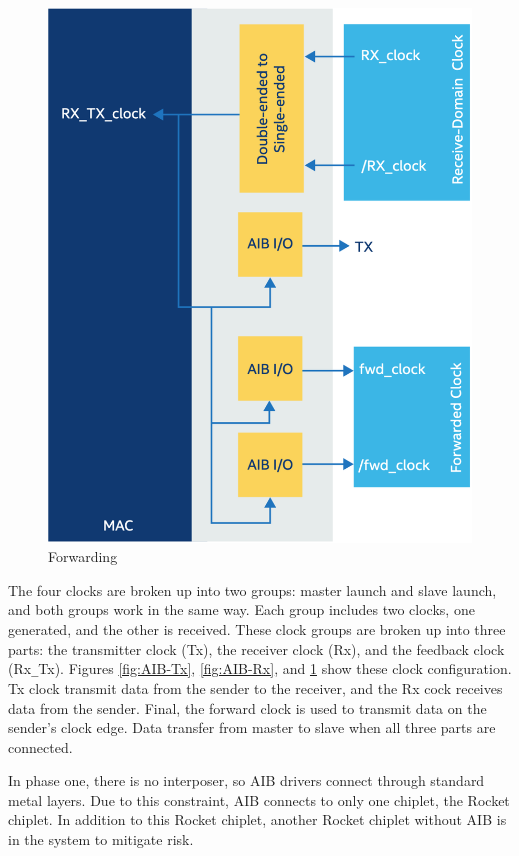 \documentclass[../main.tex]{subfiles}
\begin{document}
\begin{figure}
    \centering
    \includegraphics[scale=.27]{pngs/AIB-Rx-Tx.png}
    \caption{Forwarding\cite{AIBWhitePaper}}
    \label{fig:AIB-Rx-Tx}
\end{figure}


The four clocks are broken up into two groups: master launch and slave launch, and both groups work in the same way. Each group includes two clocks, one generated, and the other is received. These clock groups are broken up into three parts: the transmitter clock (Tx), the receiver clock (Rx), and the feedback clock (Rx\texttt{\_}Tx). Figures \ref{fig:AIB-Tx}, \ref{fig:AIB-Rx}, and \ref{fig:AIB-Rx-Tx} show these clock configuration. Tx clock transmit data from the sender to the receiver, and the Rx cock receives data from the sender. Final, the forward clock is used to transmit data on the sender's clock edge. Data transfer from master to slave when all three parts are connected.

In phase one, there is no interposer, so AIB drivers connect through standard metal layers. Due to this constraint, AIB connects to only one chiplet, the Rocket chiplet. In addition to this Rocket chiplet, another Rocket chiplet without AIB is in the system to mitigate risk. 
\end{document}

